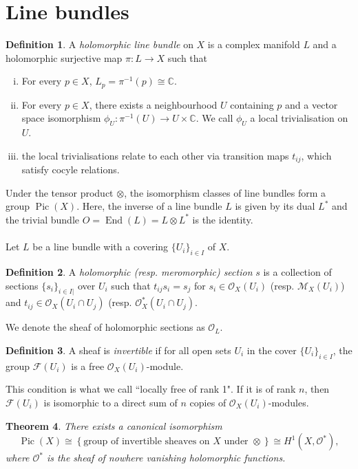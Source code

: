 \documentclass[10pt, a4paper]{article}
\theoremstyle{plain}
\newtheorem{thrm}{Theorem}[section]
\theoremstyle{definition}
\newtheorem{defn}[thrm]{Definition}
\DeclareMathOperator{\End}{End}
\DeclareMathOperator{\Pic}{Pic}
\begin{document}
\section{Line bundles}
\begin{defn} A \emph{holomorphic line bundle} on $X$ is a complex manifold $L$ and a holomorphic surjective map $\pi: L \rightarrow X$ such that 
\begin{enumerate}[(i)]
\item For every $p \in X$, $L_p = \pi^{-1}(p) \cong \mathbb{C}.$
\item For every $p \in X$, there exists a neighbourhood $U$ containing $p$ and a vector space isomorphism $\phi_U: \pi^{-1}(U) \rightarrow U \times \mathbb{C}$. We call $\phi_U$ a local trivialisation on $U$. 
\item the local trivialisations relate to each other via transition maps $t_{ij}$, which satisfy cocyle relations.
\end{enumerate}
\end{defn}
Under the tensor product $\otimes$, the isomorphism classes of line bundles form a group $\Pic(X)$. Here, the inverse of a line bundle $L$ is given by its dual $L^*$ and the trivial bundle $O = \End(L) = L \otimes L^*$ is the identity. 
\\\\
Let $L$ be a line bundle with a covering $\{U_i\}_{i \in I}$ of $X$. 
\begin{defn} A \emph{holomorphic (resp. meromorphic) section} $s$ is a collection of sections $\{s_i\}_{i \in I|}$ over $U_i$ such that $t_{ij} s_i = s_j$ for $s_i \in \mathcal{O}_X(U_i)$ (resp. $\mathcal{M}_X(U_i)$)
and $t_{ij} \in \mathcal{O}_X(U_i \cap U_j)$ (resp. $\mathcal{O}^*_X(U_i \cap U_j)$. 
\end{defn} 
We  denote the sheaf of holomorphic sections as $\mathcal{O}_L$. 
\begin{defn} A sheaf is \emph{invertible} if for all open sets $U_i$ in the cover $\{U_i\}_{i \in I}$, the group $\mathcal{F}(U_i)$ is a free $\mathcal{O}_X(U_i)$-module. 
\end{defn}
This condition is what we call ``locally free of rank 1". If it is of rank $n$, then $\mathcal{F}(U_i)$ is isomorphic to a direct sum of $n$ copies of $\mathcal{O}_X(U_i)$-modules. 
\begin{thrm} There exists a canonical isomorphism 
$$\Pic(X) \cong \left\{\text{group of invertible sheaves on $X$ under } \otimes \right\} \cong H^1(X, \mathcal{O}^*),$$
where $\mathcal{O}^*$ is the sheaf of nowhere vanishing holomorphic functions.
\end{thrm} 
\end{document}
